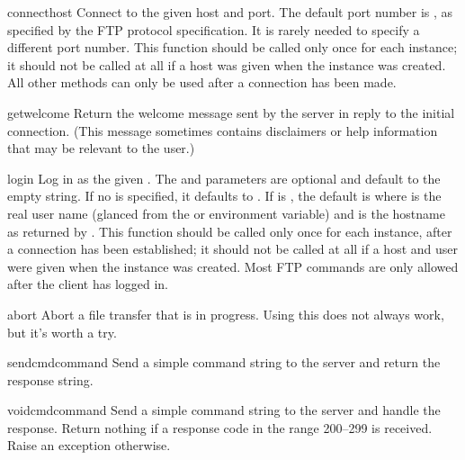 \begin{methoddesc}{connect}{host}
Connect to the given host and port.  The default port number is , as
specified by the FTP protocol specification.  It is rarely needed to
specify a different port number.  This function should be called only
once for each instance; it should not be called at all if a host was
given when the instance was created.  All other methods can only be
used after a connection has been made.
\end{methoddesc}

\begin{methoddesc}{getwelcome}{}
Return the welcome message sent by the server in reply to the initial
connection.  (This message sometimes contains disclaimers or help
information that may be relevant to the user.)
\end{methoddesc}

\begin{methoddesc}{login}{}
Log in as the given .  The  and 
parameters are optional and default to the empty string.  If no
 is specified, it defaults to .  If
 is , the default  is
 where  is the real user
name (glanced from the  or  environment
variable) and  is the hostname as returned by
.  This function should be called only
once for each instance, after a connection has been established; it
should not be called at all if a host and user were given when the
instance was created.  Most FTP commands are only allowed after the
client has logged in.
\end{methoddesc}

\begin{methoddesc}{abort}{}
Abort a file transfer that is in progress.  Using this does not always
work, but it's worth a try.
\end{methoddesc}

\begin{methoddesc}{sendcmd}{command}
Send a simple command string to the server and return the response
string.
\end{methoddesc}

\begin{methoddesc}{voidcmd}{command}
Send a simple command string to the server and handle the response.
Return nothing if a response code in the range 200--299 is received.
Raise an exception otherwise.
\end{methoddesc}

